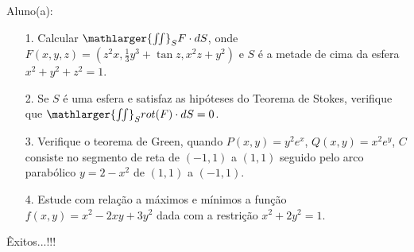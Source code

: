 \documentclass[oneside,a4paper,12pt]{article}
\begin{document}
     \begin{flushleft}
     	Aluno(a):
     \end{flushleft}
 
 \begin{itemize}
 	\item[1.] Calcular $\mathlarger{\iint}_{S}F\cdot dS$, onde $F(x,y,z)=(z^{2}x,\frac{1}{3}y^{3}+\tan z, x^{2}z+y^{2})$ e $S$ é a metade de cima da esfera $x^{2}+y^{2}+z^{2}=1$.
 \end{itemize}
 \begin{itemize}
 	\item[2.] Se $S$ é uma esfera e satisfaz as hipóteses do Teorema de Stokes, verifique que  $\mathlarger{\iint}_{S}rot (F)\cdot dS=0$. 
 \end{itemize}
 \begin{itemize}
 	\item [3.] Verifique o teorema de Green, quando $P(x,y)=y^{2}e^{x}$, $Q(x,y)=x^{2}e^{y}$, $C$ consiste no segmento de reta de $(-1,1)$ a $(1,1)$ seguido pelo arco parabólico $y=2-x^{2}$ de $(1,1)$ a $(-1,1)$.
 \end{itemize}
 \begin{itemize}
 	\item[4.] Estude com relação a máximos e mínimos a função $f(x,y)=x^{2}-2xy+3y^{2}$ dada com a restrição $x^{2}+2y^{2}=1$.
 \end{itemize}
 
\flushbottom
\flushright
Êxitos...!!!
\end{document}
